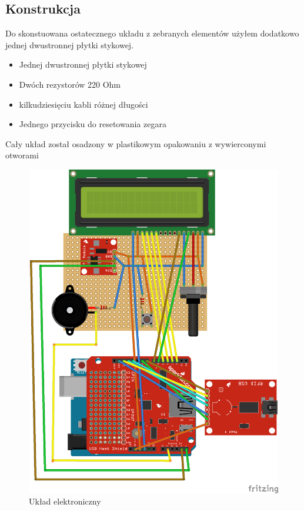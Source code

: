 \documentclass[declaration,shortabstract, mgr]{iithesis}
\begin{document}
\subsection{Konstrukcja}
\indent Do skonstuowana ostatecznego układu z zebranych elementów użyłem dodatkowo jednej dwustronnej płytki stykowej.
\begin{itemize}
\item Jednej dwustronnej płytki stykowej
\item Dwóch rezystorów 220 Ohm
\item kilkudziesięciu kabli różnej długości
\item Jednego przycisku do resetowania zegara
\end{itemize}
\indent Cały układ został osadzony w plastikowym opakowaniu z wywierconymi otworami\\
\begin{figure}[h]
\caption{Układ elektroniczny}
\centering
\includegraphics{circuit.png}
\end{figure}
\end{document}
